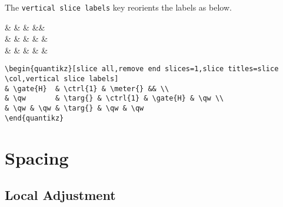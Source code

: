 \documentclass[aps,pra,10pt,nofootinbib]{revtex4}
\begin{document}
The \verb!vertical slice labels! key reorients the labels as below. 
\begin{Code}
\begin{center}
\begin{quantikz}[slice all,remove end slices=1,slice titles=slice \col,vertical slice labels]
&  &  & \meter{} && \\
& \qw       & \targ{} &  &  & \qw \\
& \qw & \qw & \targ{} & \qw & \qw
\end{quantikz}
\end{center}
\tcblower
\begin{lstlisting}
\begin{quantikz}[slice all,remove end slices=1,slice titles=slice \col,vertical slice labels]
& \gate{H}  & \ctrl{1} & \meter{} && \\
& \qw       & \targ{} & \ctrl{1} & \gate{H} & \qw \\
& \qw & \qw & \targ{} & \qw & \qw
\end{quantikz}
\end{lstlisting}
\end{Code}

\section{Spacing}\label{sec:spacing}

\subsection{Local Adjustment}
\end{document}
